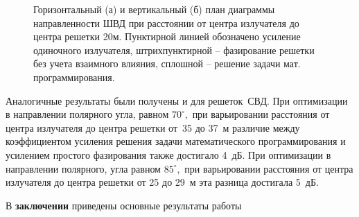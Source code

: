 \begin{figure}
\begin{minipage}[h]{0.49\linewidth}
\end{minipage}
\hfill
\begin{minipage}[h]{0.49\linewidth}
\end{minipage}
\caption{Горизонтальный (а) и вертикальный (б) план диаграммы направленности ШВД при расстоянии от центра излучателя до центра решетки 20м. Пунктирной линией обозначено усиление одиночного излучателя, штрихпунктирной – фазирование решетки без учета взаимного влияния, сплошной – решение задачи мат. программирования.}
\label{pic:r_bvd_result_0}
\end{figure}

Аналогичные результаты были получены и для решеток~СВД. При оптимизации в направлении полярного угла, равном $70^{\circ},$ при варьировании расстояния от центра излучателя до центра решетки от~35 до 37~м различие между коэффициентом усиления решения задачи математического программирования и усилением простого фазирования также достигало 4~дБ.  При оптимизации в направлении полярного, угла равном $85^{\circ},$ при варьировании расстояния от центра излучателя до центра решетки от 25 до 29~м эта разница достигала 5~дБ.

\FloatBarrier
{}                                  %
В {\textbf{заключении}} приведены основные результаты работы



